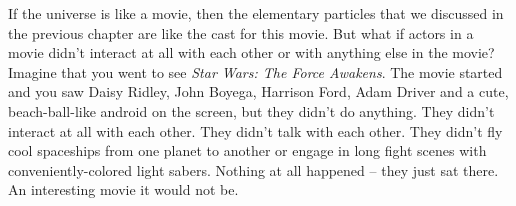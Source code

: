 If the universe is like a movie, then the elementary particles
that we discussed in the previous chapter are like the cast for
this movie.  But what if actors in a movie didn't interact at all
with each other or with anything else in the movie?  Imagine that
you went to see {\it Star Wars:  The Force Awakens}.
The movie started and you saw Daisy Ridley, John Boyega, 
Harrison Ford, Adam Driver and a cute, beach-ball-like android 
on the screen, but they didn't do anything.  They
didn't interact at all with each other.  They didn't talk with
each other.  They didn't fly cool spaceships from one planet to
another or engage in long fight scenes with conveniently-colored
light sabers.  Nothing at all happened -- they just sat there.   An
interesting movie it would not be.
